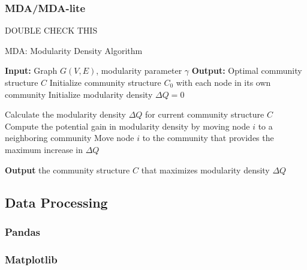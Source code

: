\subsubsection{ MDA/MDA-lite}

DOUBLE CHECK THIS
\begin{algorithm}
\caption{MDA: Modularity Density Algorithm}\label{alg:mda}
\begin{algorithmic}[1]
\State \textbf{Input:} Graph $G(V, E)$, modularity parameter $\gamma$
\State \textbf{Output:} Optimal community structure $C$
\State Initialize community structure $C_0$ with each node in its own community
\State Initialize modularity density $\Delta Q = 0$

\Repeat
    \State Calculate the modularity density $\Delta Q$ for current community structure $C$
        \State Compute the potential gain in modularity density by moving node $i$ to a neighboring community
            \State Move node $i$ to the community that provides the maximum increase in $\Delta Q$
        \EndIf
    \EndFor
{}

\State \textbf{Output} the community structure $C$ that maximizes modularity density $\Delta Q$
\end{algorithmic}
\end{algorithm}

\newpage

\subsection{Data Processing}

\subsubsection{Pandas}

\subsubsection{Matplotlib}

